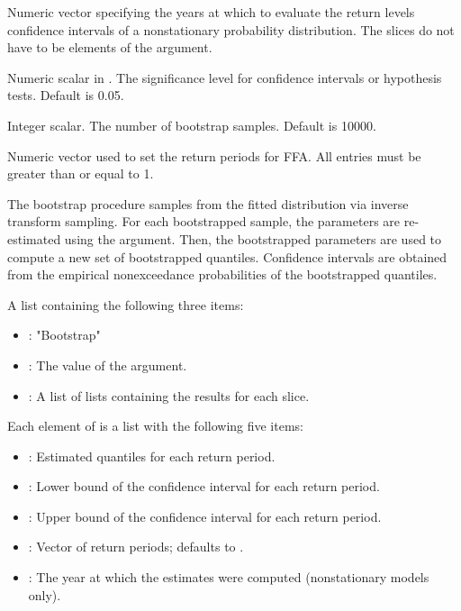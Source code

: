 \documentclass[a4paper]{book}
\begin{document}
\begin{Arguments}
\begin{ldescription}
\begin{itemize}
\end{itemize}


\item[\code{slices}] Numeric vector specifying the years at which to evaluate the
return levels confidence intervals of a nonstationary probability distribution.
The slices do not have to be elements of the  argument.

\item[\code{alpha}] Numeric scalar in \eqn{[0.01, 0.1]}{}. The significance
level for confidence intervals or hypothesis tests. Default is 0.05.

\item[\code{samples}] Integer scalar. The number of bootstrap samples. Default is 10000.

\item[\code{periods}] Numeric vector used to set the return periods for FFA.
All entries must be greater than or equal to 1.
\end{ldescription}
\end{Arguments}
%
\begin{Details}
The bootstrap procedure samples from the fitted distribution via inverse
transform sampling. For each bootstrapped sample, the parameters are re-estimated
using the  argument. Then, the bootstrapped parameters are used to compute
a new set of bootstrapped quantiles. Confidence intervals are obtained from the
empirical nonexceedance probabilities of the bootstrapped quantiles.
\end{Details}
%
\begin{Value}
A list containing the following three items:
\begin{itemize}

\item{} : "Bootstrap"
\item{} : The value of the  argument.
\item{} : A list of lists containing the results for each slice.

\end{itemize}


Each element of  is a list with the following five items:
\begin{itemize}

\item{} : Estimated quantiles for each return period.
\item{} : Lower bound of the confidence interval for each return period.
\item{} : Upper bound of the confidence interval for each return period.
\item{} : Vector of return periods; defaults to .
\item{} : The year at which the estimates were computed (nonstationary models only).

\end{itemize}

\end{Value}
\end{document}

